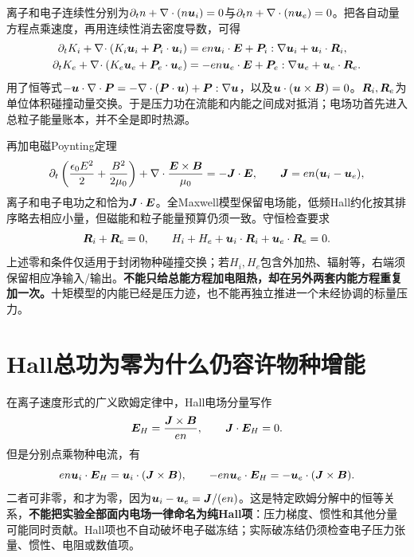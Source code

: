 \documentclass[UTF8,a4paper,11pt,openany,fontset=fandol]{ctexbook}
\begin{document}
离子和电子连续性分别为$\partial_t n+\nabla\cdot(n\bm{u}_i)=0$与$\partial_t n+\nabla\cdot(n\bm{u}_e)=0$。把各自动量方程点乘速度，再用连续性消去密度导数，可得
\begin{align}
\partial_tK_i+\nabla\!\cdot(K_i\bm{u}_i+\bm{P}_i\cdot\bm{u}_i)
 &=en\bm{u}_i\cdot\bm{E}+\bm{P}_i:\nabla\bm{u}_i+\bm{u}_i\cdot\bm{R}_i,\\
\partial_tK_e+\nabla\!\cdot(K_e\bm{u}_e+\bm{P}_e\cdot\bm{u}_e)
 &=-en\bm{u}_e\cdot\bm{E}+\bm{P}_e:\nabla\bm{u}_e+\bm{u}_e\cdot\bm{R}_e.
\end{align}
用了恒等式$-\bm{u}\cdot\nabla\cdot\bm{P}=-\nabla\cdot(\bm{P}\cdot\bm{u})+\bm{P}:\nabla\bm{u}$，以及$\bm{u}\cdot(\bm{u}\times\bm{B})=0$。$\bm{R}_i,\bm{R}_e$为单位体积碰撞动量交换。于是压力功在流能和内能之间成对抵消；电场功首先进入总粒子能量账本，并不全是即时热源。

再加电磁Poynting定理
\begin{equation}
\partial_t\left(\frac{\epsilon_0E^2}{2}+\frac{B^2}{2\mu_0}\right)
+\nabla\cdot\frac{\bm{E}\times\bm{B}}{\mu_0}=-\bm{J}\cdot\bm{E},\qquad
\bm{J}=en(\bm{u}_i-\bm{u}_e),
\end{equation}
离子和电子电功之和恰为$\bm{J}\cdot\bm{E}$。全Maxwell模型保留电场能，低频Hall约化按其排序略去相应小量，但磁能和粒子能量预算仍须一致。守恒检查要求
\begin{equation}
\bm{R}_i+\bm{R}_e=0,\qquad H_i+H_e+\bm{u}_i\cdot\bm{R}_i+\bm{u}_e\cdot\bm{R}_e=0.
\end{equation}
上述零和条件仅适用于封闭物种碰撞交换；若$H_i,H_e$包含外加热、辐射等，右端须保留相应净输入/输出。\textbf{不能只给总能方程加电阻热，却在另外两套内能方程重复加一次。}十矩模型的内能已经是压力迹，也不能再独立推进一个未经协调的标量压力。

\section{Hall总功为零为什么仍容许物种增能}
在离子速度形式的广义欧姆定律中，Hall电场分量写作
\begin{equation}
\bm{E}_H=\frac{\bm{J}\times\bm{B}}{en},\qquad \bm{J}\cdot\bm{E}_H=0.
\end{equation}
但是分别点乘物种电流，有
\begin{equation}
en\bm{u}_i\cdot\bm{E}_H=\bm{u}_i\cdot(\bm{J}\times\bm{B}),\qquad
-en\bm{u}_e\cdot\bm{E}_H=-\bm{u}_e\cdot(\bm{J}\times\bm{B}).
\end{equation}
二者可非零，和才为零，因为$\bm{u}_i-\bm{u}_e=\bm{J}/(en)$。这是特定欧姆分解中的恒等关系，\textbf{不能把实验全部面内电场一律命名为纯Hall项}：压力梯度、惯性和其他分量可能同时贡献。Hall项也不自动破坏电子磁冻结；实际破冻结仍须检查电子压力张量、惯性、电阻或数值项。
\end{document}
